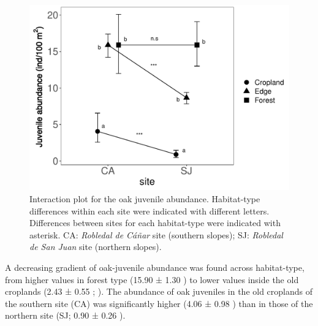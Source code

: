 \begin{table}[]
\caption{Model selection for the oak juvenile abundance, sorted by minimum AICc value.}
%
\label{tab:coloniza:modelselection}
\end{table}

\begin{figure}
    \centering
    \includegraphics[width=\textwidth,height=8cm,
  keepaspectratio]{img/coloniza/coloniza-juvenile-interaction.pdf}
    \caption{Interaction plot for the oak juvenile abundance. Habitat-type differences within each site were indicated with different letters. Differences between sites for each habitat-type were indicated with asterisk. CA: \emph{Robledal de Cáñar} site (southern slopes); SJ: \emph{Robledal de San Juan} site (northern slopes).}
    \label{fig:coloniza:interaction}
\end{figure}

A decreasing gradient of oak-juvenile abundance was found across habitat-type, from higher values in forest type (15.90 ± 1.30 \juv) to lower values inside the old croplands (2.43 ± 0.55 \juv; ). The abundance of oak juveniles in the old croplands of the southern site (CA) was significantly higher (4.06 ± 0.98 \juv) than in those of the northern site (SJ; 0.90 ± 0.26 \juv). 

